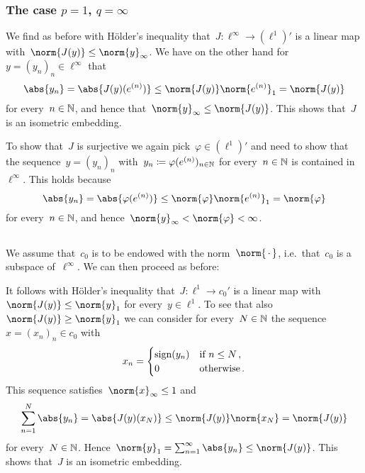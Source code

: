 \subsubsection*{The case $p = 1$, $q = \infty$}

We find as before with Hölder’s inequality that~$J \colon \ell^\infty \to (\ell^1)'$ is a {\welldef} linear map with~$\norm{J(y)} \leq \norm{y}_\infty$.
We have on the other hand for~$y = (y_n)_n \in \ell^\infty$ that
\[
        \abs{y_n}
  =     \abs{ J(y)(e^{(n)}) }
  \leq  \norm{J(y)} \norm{ e^{(n)} }_1
  =     \norm{J(y)}
\]
for every~$n \in \mathbb{N}$, and hence that~$\norm{y}_\infty \leq \norm{J(y)}$.
This shows that~$J$ is an isometric embedding.

To show that~$J$ is surjective we again pick~$\varphi \in (\ell^1)'$ and need to show that the sequence~$y = (y_n)_n$ with~$y_n \coloneqq \varphi(e^{(n)})_{n \in \mathbb{N}}$ for every~$n \in \mathbb{N}$ is contained in~$\ell^\infty$.
This holds because
\[
        \abs{y_n}
  =     \abs{ \varphi(e^{(n)}) }
  \leq  \norm{\varphi} \norm{e^{(n)}}_1
  =     \norm{\varphi}
\]
for every~$n \in \mathbb{N}$, and hence~$\norm{y}_\infty < \norm{\varphi} < \infty$.





\subsection{}

We assume that~$c_0$ is to be endowed with the norm~$\norm{\,\cdot\,}$, i.e.\ that~$c_0$ is a subspace of~$\ell^\infty$.
We can then proceed as before:

It follows with Hölder’s inequality that~$J \colon \ell^1 \to c_0'$ is a {\welldef} linear map with~$\norm{J(y)} \leq \norm{y}_1$ for every~$y \in \ell^1$.
To see that also~$\norm{J(y)} \geq \norm{y}_1$ we can consider for every~$N \in \mathbb{N}$ the sequence~$x = (x_n)_n \in c_0$ with
\[
    x_n
  = \begin{cases}
      \operatorname{sign}(y_n)  & \text{if~$n \leq N$}  \,, \\
      0           & \text{otherwise}      \,.
    \end{cases}
\]
This sequence satisfies~$\norm{x}_\infty \leq 1$ and
\[
        \sum_{n=1}^N \abs{y_n}
  =     \abs{ J(y)(x_N) }
  \leq  \norm{J(y)} \norm{x_N}
  =     \norm{J(y)}
\]
for every~$N \in \mathbb{N}$.
Hence~$\norm{y}_1 = \sum_{n=1}^\infty \abs{y_n} \leq \norm{J(y)}$.
This shows that~$J$ is an isometric embedding.

